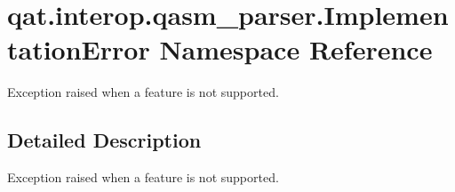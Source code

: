 \hypertarget{namespaceqat_1_1interop_1_1qasm__parser_1_1ImplementationError}{\section{qat.\-interop.\-qasm\-\_\-parser.\-Implementation\-Error Namespace Reference}
\label{namespaceqat_1_1interop_1_1qasm__parser_1_1ImplementationError}
}


Exception raised when a feature is not supported.  




\subsection{Detailed Description}
Exception raised when a feature is not supported. 